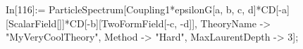 In[116]:= ParticleSpectrum[Coupling1*epsilonG[a, b, c, d]*CD[-a][ScalarField[]]*CD[-b][TwoFormField[-c, -d]], TheoryName -> "MyVeryCoolTheory", Method -> "Hard", MaxLaurentDepth -> 3]; 